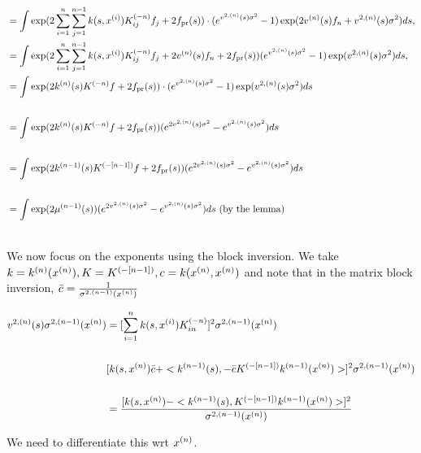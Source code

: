 \begin{align}
 \begin{split}
&= \int  \exp(2\sum_{i=1}^{n}\sum_{j=1}^{n-1}  k(s,\xii)K_{ij}^{(-n)}f_j + 2f_\pr(s)) \cdot 
	      (e^{\vnssqr\sigma^2 } - 1)\exp( 2\vns f_n + \vnssqr \sigma^2 )  ds,\\
%
&= \int \exp(2\sum_{i=1}^{n}\sum_{j=1}^{n-1}  k(s,\xii)K_{ij}^{(-n)}f_j + 2\vns f_n + 2f_\pr(s)) 
	(e^{\vnssqr \sigma^2 } - 1)\exp( \vnssqr \sigma^2 )  ds,\\
&= \int \exp(2\kn(s)\Kinvn f + 2f_\pr(s)) \cdot  (e^{\vnssqr \sigma^2 } - 1)\exp( \vnssqr \sigma^2 )  ds\\\\
%
%
%
&= \int \exp(2\kn(s)\Kinvn f + 2f_\pr(s)) (e^{2 \vnssqr\sigma^2 } - e^{\vnssqr \sigma^2 }) ds\\\\
%
%
%
&=\int \exp(2k^{(n-1)}(s)\Kinvnm f + 2f_\pr(s)) (e^{2\vnssqr \sigma^2 } - e^{\vnssqr \sigma^2 }) ds\\\\ 
%
%
%
%
&=\int \exp(2\mu^{(n-1)}(s)) (e^{2\vnssqr \sigma^2 } - e^{\vnssqr \sigma^2 }) ds \text{ (by the lemma) }\\\\ 
%
%
\end{split}
\end{align}

We now focus on the exponents using the block inversion. We take $k = k^{(n)}(x^{(n)}), K = K^{(-[n-1])}, c = k(x^{(n)},x^{(n)})$ and note 
that in the matrix block inversion, $\bar{c} =\frac{1}{\sigma ^{2 , (n-1)} (x^{(n)})}$

\begin{align}
 \begin{split}
%
%
  \vnssqr \sqnm(\xn) &= [\sum_{i=1}^n k(s,\xii)\Kinvn_{in}]^2\sqnm(\xn)  \\\\
% 
%
%
  & [k(s, \xn) \bar{c} + < k^{(n-1)}(s) ,  -\bar{c}\Kinvnm k^{(n-1)}(\xn) >]^2\sqnm(\xn)  \\\\
% 
%
%
  &= \frac{[k(s, \xn) - < k^{(n-1)}(s) ,  \Kinvnm k^{(n-1)}(\xn) > ]^2}{\sqnm(\xn)} \\
\end{split}
\end{align}

We need to differentiate this wrt $x^{(n)}$.



